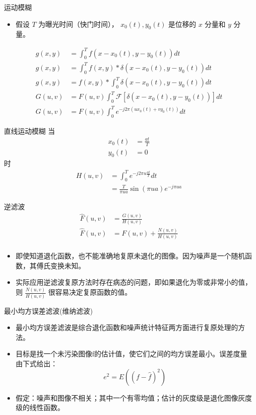 \documentclass[presentation]{beamer}
\begin{document}
\begin{frame}[label={sec:org66e3d7f}]{运动模糊}
\begin{itemize}
\item 假设 \(T\) 为曝光时间（快门时间）， \(x_0(t),y_0(t)\) 是位移的 \(x\) 分量和 \(y\) 分量。
\end{itemize}
\begin{align*}
g(x,y) &= \int_0^T f(x-x_0(t),y-y_0(t)) dt \\
g(x,y) &= \int_0^T f(x,y)*\delta(x-x_0(t),y-y_0(t)) dt \\
g(x,y) &= f(x,y)* \int_0^T \delta(x-x_0(t),y-y_0(t)) dt \\
G(u,v) &= F(u,v) \int_0^T \mathcal{F}[\delta(x-x_0(t),y-y_0(t))] dt \\
G(u,v) &= F(u,v) \int_0^T e^{-j2\pi(ux_0(t)+vy_0(t))} dt 
\end{align*}
\end{frame}

\begin{frame}[label={sec:orgfb662c2}]{直线运动模糊}
当
\begin{align*}
x_0(t) &=\frac{at}{T} \\
y_0(t) &=0
\end{align*}
时
\begin{align*}
H(u,v) &=\int_0^T e^{-j2\pi u \frac{at}{T}} dt \\
&=\frac{T}{\pi u a} \sin(\pi u a) e^{-j\pi u a}
\end{align*}
\end{frame}

\begin{frame}[label={sec:orgca07e4d}]{逆滤波}
\begin{align*}
 \hat F(u,v) &= \frac{G(u,v)}{H(u,v)} \\
 \hat F(u,v) &= F(u,v)+\frac{N(u,v)}{H(u,v)} \\
\end{align*}

\begin{itemize}
\item 即使知道退化函数，也不能准确地复原未退化的图像。因为噪声是一个随机函数，其傅氏变换未知。
\item 实际应用逆滤波复原方法时存在病态的问题，即如果退化为零或非常小的值，则 \(\frac{N(u,v)}{H(u,v)}\) 很容易决定复原函数的值。
\end{itemize}
\end{frame}

\begin{frame}[label={sec:org4e0382c}]{最小均方误差滤波(维纳滤波)}
\begin{itemize}
\item 最小均方误差滤波是综合退化函数和噪声统计特征两方面进行复原处理的方法。
\item 目标是找一个未污染图像f的估计值，使它们之间的均方误差最小。误差度量由下式给出：
\[ e^2 = E((f-\hat f)^2) \]
\item 假定：噪声和图像不相关；其中一个有零均值；估计的灰度级是退化图像灰度级的线性函数。
\end{itemize}
\end{frame}
\end{document}
